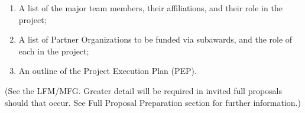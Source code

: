 \documentclass[oneside,11pt]{amsart}
\begin{document}
\begin{enumerate}
%
\item A list of the major team members, their affiliations, and their
role in the project;
%
\item A list of Partner Organizations to be funded via subawards, and
the role of each in the project;
%
\item An outline of the Project Execution Plan (PEP).
\end{enumerate}

(See the LFM/MFG. Greater detail will be required in invited full
proposals should that occur. See Full Proposal Preparation section for
further information.)

\end{document}
